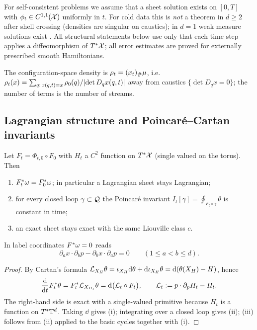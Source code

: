\begin{assumption}\label{ass:regular}
For self-consistent problems we assume that a sheet solution exists on $[0,T]$ with $\phi_t\in C^{1,1}(\mathcal{X})$
uniformly in $t$. For cold data this is \emph{not} a theorem in $d\ge2$ after shell crossing (densities are
singular on caustics); in $d=1$ weak measure solutions exist \cite{ZhengMajda1994}. All structural statements below
use only that each time step applies a diffeomorphism of $T^*\mathcal{X}$; all error estimates are proved for externally
prescribed smooth Hamiltonians.
\end{assumption}

The configuration-space density is $\rho_t=(x_t){}_{\#}\mu$, i.e.\ $\rho_t(x)=\sum_{q:\,x(q,t)=x}\rho_0(q)/\lvert \det D_qx(q,t)\rvert$
away from caustics $\{\det D_qx=0\}$; the number of terms is the number of streams.

\subsection{Lagrangian structure and Poincar\'e--Cartan invariants}

\begin{proposition}\label{prop:invariants}
Let $F_t=\Phi_{t,0}\circ F_0$ with $H_t$ a $C^2$ function on $T^*\mathcal{X}$ (single valued on the torus). Then
\begin{enumerate}[label=(\roman*),leftmargin=2.2em,itemsep=1pt]
\item $F_t^*\omega=F_0^*\omega$; in particular a Lagrangian sheet stays Lagrangian;
\item for every closed loop $\gamma\subset\mathcal{Q}$ the Poincar\'e invariant $I_t[\gamma]=\oint_{F_t\circ\gamma}\theta$ is constant in time;
\item an exact sheet stays exact with the same Liouville class $c$.
\end{enumerate}
In label coordinates $F^*\omega=0$ reads
\begin{equation}\label{eq:cauchy}
\partial_ax\cdot\partial_bp-\partial_bx\cdot\partial_ap=0\qquad(1\le a<b\le d).
\end{equation}
\end{proposition}
\begin{proof}
By Cartan's formula $\mathcal{L}_{X_H}\theta=\iota_{X_H}\mathrm{d}\theta+\mathrm{d}\iota_{X_H}\theta=\mathrm{d}(\theta(X_H)-H)$, hence
\begin{equation}\label{eq:dtheta}
\frac{\mathrm{d}}{\mathrm{d} t}F_t^*\theta=F_t^*\mathcal{L}_{X_{H_t}}\theta=\mathrm{d}\big(\mathcal{L}_t\circ F_t\big),\qquad
\mathcal{L}_t:=p\cdot\partial_pH_t-H_t .
\end{equation}
The right-hand side is exact with a single-valued primitive because $H_t$ is a function on $T^*\mathbb{T}^d$. Taking
$\dd$ gives (i); integrating over a closed loop gives (ii); (iii) follows from (ii) applied to the basic cycles
together with (i).
\end{proof}


